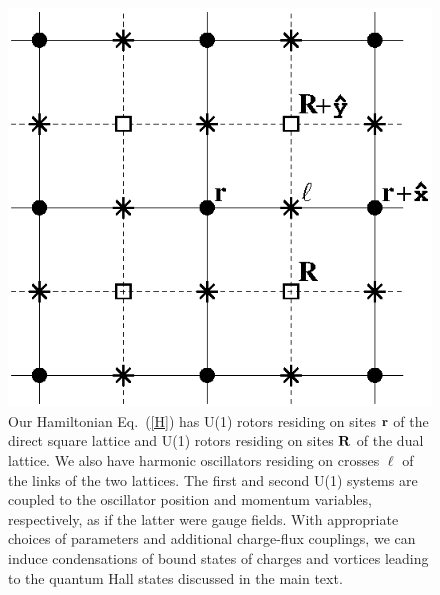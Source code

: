 \begin{figure}
\includegraphics[width=\linewidth]{figures/H.eps}
\caption{Our Hamiltonian Eq.~(\ref{H}) has U(1) rotors residing on sites ${\bf r}$ of the direct square lattice and U(1) rotors residing on sites ${\bf R}$ of the dual lattice.  We also have harmonic oscillators residing on crosses $\ell$ of the links of the two lattices.  The first and second U(1) systems are coupled to the oscillator position and momentum variables, respectively, as if the latter were gauge fields.\cite{footnoteKitaev}  With appropriate choices of parameters and additional charge-flux couplings, we can induce condensations of bound states of charges and vortices leading to the quantum Hall states discussed in the main text.}
\label{fig:H}
\end{figure}


